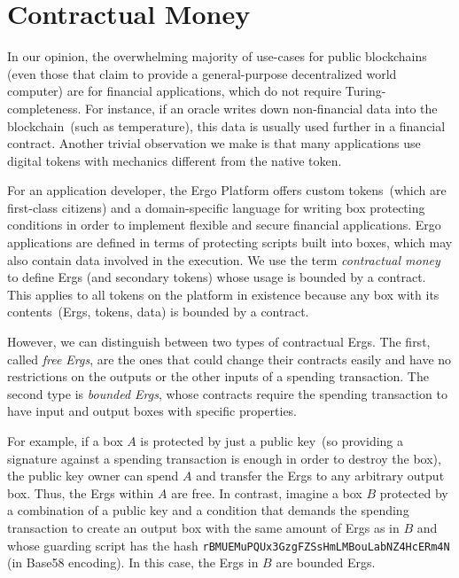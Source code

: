 

\section{Contractual Money}
    \label{sec:contractual}

 In our opinion, the overwhelming majority of use-cases for public blockchains (even those that claim to provide a general-purpose decentralized world computer) are for financial applications, which do not require Turing-completeness. For instance, if an oracle writes down non-financial data into the blockchain~(such as temperature), this data is usually used further in a financial
 contract. Another trivial observation we make is that many applications use digital tokens with mechanics different from the native token.

For an application developer, the Ergo Platform offers custom tokens~(which are first-class citizens) and a domain-specific language for writing box protecting
 conditions in order to implement flexible and secure financial applications.
 Ergo applications are defined in terms of protecting scripts built into boxes, which may also contain data involved in the execution.
 We use the term {\em contractual money} to define Ergs (and secondary tokens) whose usage is bounded by a contract. This applies to all tokens on the platform in existence because any box with its contents~(Ergs, tokens, data) is bounded by a contract.
 
 However, we can distinguish between two types of contractual Ergs. The first, called {\em free Ergs}, are the ones that could change their contracts easily and have no restrictions on the outputs or the other inputs of a spending transaction. The second type is {\em bounded Ergs}, whose contracts require the spending transaction to have input and output boxes with specific properties.
 
 For example, if a box $A$ is protected by just a public key~(so providing a signature against a spending transaction is enough in order to destroy the box), the public key owner can spend $A$ and transfer the Ergs to any arbitrary output box. Thus, the Ergs within $A$ are free. 
In contrast, imagine a box $B$ protected by a combination of a public key and a condition that demands the spending transaction to create an output box with the same amount of Ergs as in $B$ and whose guarding script has the hash \texttt{rBMUEMuPQUx3GzgFZSsHmLMBouLabNZ4HcERm4N} (in Base58 encoding). In this case, the Ergs in $B$ are bounded Ergs.
 
